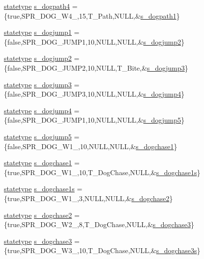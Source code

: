 \begin{DoxyCompactItemize}
\hyperlink{structstatestruct}{statetype} \hyperlink{WL__ACT2_8C_a6f8e4e0307bf9bcad5cc99130e5ba475}{s\_\-dogpath4} = \{true,SPR\_\-DOG\_\-W4\_,15,T\_\-Path,NULL,\&\hyperlink{WL__ACT2_8C_a2e8c7bd87e415805e988798640b496aa}{s\_\-dogpath1}\}
\item 
\hyperlink{structstatestruct}{statetype} \hyperlink{WL__ACT2_8C_afc318b0d900021e2166f94900d665c0a}{s\_\-dogjump1} = \{false,SPR\_\-DOG\_\-JUMP1,10,NULL,NULL,\&\hyperlink{WL__ACT2_8C_a8d953ba0abbbc775086560c64c62ba38}{s\_\-dogjump2}\}
\item 
\hyperlink{structstatestruct}{statetype} \hyperlink{WL__ACT2_8C_a8d953ba0abbbc775086560c64c62ba38}{s\_\-dogjump2} = \{false,SPR\_\-DOG\_\-JUMP2,10,NULL,T\_\-Bite,\&\hyperlink{WL__ACT2_8C_a6820b94974ae76b9a6e1ffa7f34dd61d}{s\_\-dogjump3}\}
\item 
\hyperlink{structstatestruct}{statetype} \hyperlink{WL__ACT2_8C_a6820b94974ae76b9a6e1ffa7f34dd61d}{s\_\-dogjump3} = \{false,SPR\_\-DOG\_\-JUMP3,10,NULL,NULL,\&\hyperlink{WL__ACT2_8C_a9efbbafd02f33c3221db430f51d109c2}{s\_\-dogjump4}\}
\item 
\hyperlink{structstatestruct}{statetype} \hyperlink{WL__ACT2_8C_a9efbbafd02f33c3221db430f51d109c2}{s\_\-dogjump4} = \{false,SPR\_\-DOG\_\-JUMP1,10,NULL,NULL,\&\hyperlink{WL__ACT2_8C_a13801465629bd18b57ad2d9bfa6b8fab}{s\_\-dogjump5}\}
\item 
\hyperlink{structstatestruct}{statetype} \hyperlink{WL__ACT2_8C_a13801465629bd18b57ad2d9bfa6b8fab}{s\_\-dogjump5} = \{false,SPR\_\-DOG\_\-W1\_,10,NULL,NULL,\&\hyperlink{WL__DEF_8H_a50a4f7d61d6b2fe4fb9a477b1ac624e7}{s\_\-dogchase1}\}
\item 
\hyperlink{structstatestruct}{statetype} \hyperlink{WL__ACT2_8C_a50a4f7d61d6b2fe4fb9a477b1ac624e7}{s\_\-dogchase1} = \{true,SPR\_\-DOG\_\-W1\_,10,T\_\-DogChase,NULL,\&\hyperlink{WL__ACT2_8C_ac1e945faeeb8ce63796f06ad7126503a}{s\_\-dogchase1s}\}
\item 
\hyperlink{structstatestruct}{statetype} \hyperlink{WL__ACT2_8C_ac1e945faeeb8ce63796f06ad7126503a}{s\_\-dogchase1s} = \{true,SPR\_\-DOG\_\-W1\_,3,NULL,NULL,\&\hyperlink{WL__ACT2_8C_ae36e705e7161bfbabc90b7447d82e999}{s\_\-dogchase2}\}
\item 
\hyperlink{structstatestruct}{statetype} \hyperlink{WL__ACT2_8C_ae36e705e7161bfbabc90b7447d82e999}{s\_\-dogchase2} = \{true,SPR\_\-DOG\_\-W2\_,8,T\_\-DogChase,NULL,\&\hyperlink{WL__ACT2_8C_ae9e5cb1977ba76a76de4a6ebee8c385e}{s\_\-dogchase3}\}
\item 
\hyperlink{structstatestruct}{statetype} \hyperlink{WL__ACT2_8C_ae9e5cb1977ba76a76de4a6ebee8c385e}{s\_\-dogchase3} = \{true,SPR\_\-DOG\_\-W3\_,10,T\_\-DogChase,NULL,\&\hyperlink{WL__ACT2_8C_a1d7285618b28c1fc7a6bebed630f9907}{s\_\-dogchase3s}\}

\end{DoxyCompactItemize}
